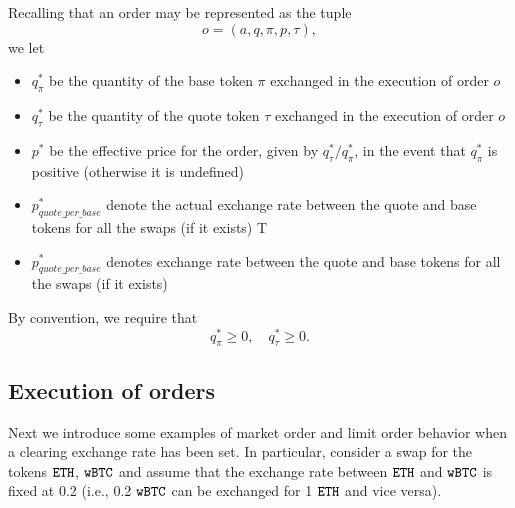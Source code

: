 \documentclass[11pt, reqno]{amsart}
\theoremstyle{definition}
\theoremstyle{remark}
\newcommand{\BTC}{\textnormal{\texttt{wBTC}}}
\newcommand{\ETH}{\textnormal{\texttt{ETH}}}
\begin{document}
Recalling that an order may be represented as the tuple
\[
	o = (a, q, \pi, p, \tau),
\]
we let
\begin{itemize}
	\item $q_\pi^*$ be the quantity of the base token $\pi$ exchanged in the
	      execution of order $o$
	\item $q_\tau^*$ be the quantity of the quote token $\tau$ exchanged in
          the execution of order $o$
      \item $p^*$ be the effective price for the order, given by
          $q_\tau^* / q_\pi^*$, in the event that $q_\pi^*$ is positive
          (otherwise it is undefined)
    \item $p_{quote\_per\_base}^*$ denote the actual exchange rate between the
          quote and base tokens for all the swaps (if it exists)
	T\item $p_{quote\_per\_base}^*$ denotes exchange rate between the quote
          and base tokens for all the swaps (if it exists)
\end{itemize}
By convention, we require that
\[
    q_\pi^* \geq 0, \quad q_\tau^* \geq 0.
\]

\subsection{Execution of orders}
Next we introduce some examples of market order and limit order behavior when
a clearing exchange rate has been set.
In particular, consider a swap for the tokens $\ETH$, $\BTC$ and assume that
the exchange rate between $\ETH$ and $\BTC$ is fixed at 0.2 (i.e.,
0.2 $\BTC$ can be exchanged for 1 $\ETH$ and vice versa).
\end{document}
